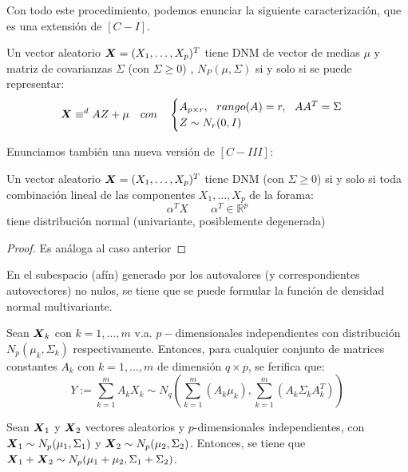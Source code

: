 Con todo este procedimiento, podemos enunciar la siguiente caracterización, que es una extensión de $[C-I]$.
\begin{nprop}[$\bar{[C-I]}$]
  Un vector aleatorio $\boldsymbol{X} = (X_1,\dots,X_p)^T$ tiene DNM de vector de medias $\mu$ y matriz de covarianzas $\Sigma$ (con $\Sigma \geq 0$) , $N_P(\mu,\Sigma)$ si y solo si se puede representar:
  \[
\vectX \equiv^{d} AZ + \mu \quad con \quad \begin{cases} A_{p\times r}, \ \ rango(A) = r, \ \ AA^T = \Sigma \\ Z\sim N_r(0,I)\end{cases}
  \]
\end{nprop}
Enunciamos también una nueva versión de $[C-III]$:
\begin{nprop}[$\bar{[C-III]}$]
  Un vector aleatorio $\boldsymbol{X} = (X_1,\dots,X_p)^T$ tiene DNM (con $\Sigma \geq 0$) si y solo si toda combinación lineal de las componentes $X_1,\dots,X_p$ de la forama:
  \[
\alpha^T X \quad \quad \alpha^T \in \mathbb R^p
\]
tiene distribución normal (univariante, posiblemente degenerada)
\end{nprop}
\begin{proof}
Es análoga al caso anterior
\end{proof}

\begin{ndef}[$\bar{[D]}$]
  En el subespacio (afín) generado por los autovalores (y correspondientes autovectores) no nulos, se tiene que se puede formular la función de densidad normal multivariante.

\end{ndef}

\begin{nprop}
  Sean $\boldsymbol{X}_k$ con $k = 1,\dots,m$ v.a. $p-$dimensionales independientes con distribución $N_p(\mu_k, \Sigma_k)$ respectivamente. Entonces, para cualquier conjunto de matrices constantes $A_k$ con $k = 1,\dots, m$ de dimensión $q\times p$, se ferifica que:
  \[
Y:= \sum_{k=1}^{m} A_k X_k \sim N_q(\sum_{k=1}^m(A_k \mu_k), \sum_{k=1}^m(A_k \Sigma_k A_k^T))
  \]
\end{nprop}

\begin{nth}[Cramer]
  Sean $\boldsymbol{X}_1$ y $\boldsymbol{X}_2$ vectores aleatorios y $p$-dimensionales independientes, con $\boldsymbol{X}_1 \sim N_p(\mu_1, \Sigma_1)$ y $\boldsymbol{X}_2 \sim N_p(\mu_2, \Sigma_2)$. Entonces, se tiene que $\boldsymbol{X}_1 + \boldsymbol{X}_2 \sim N_p(\mu_1 + \mu_2, \Sigma_1 + \Sigma_2)$.
\end{nth}

